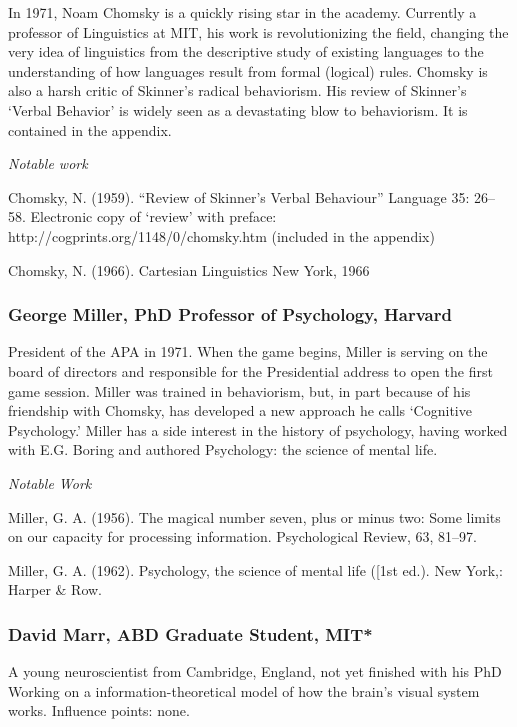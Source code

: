 \begin{refsection}
In 1971, Noam Chomsky is a quickly rising star in the academy. Currently a professor of Linguistics at MIT, his work is revolutionizing the field, changing the very idea of linguistics from the descriptive study of existing languages to the understanding of how languages result from formal (logical) rules. Chomsky is also a harsh critic of Skinner's radical behaviorism. His review of Skinner's `Verbal Behavior' is widely seen as a devastating blow to behaviorism. It is contained in the appendix.

\emph{Notable work}

Chomsky, N. (1959). ``Review of Skinner's Verbal Behaviour'' Language 35: 26--58. Electronic copy of `review' with preface: http:\slash \slash cogprints.org\slash 1148\slash 0\slash chomsky.htm (included in the appendix)

Chomsky, N. (1966). Cartesian Linguistics New York, 1966

\subsubsection{George Miller, PhD Professor of Psychology, Harvard}
\label{georgemillerphdprofessorofpsychologyharvard}

President of the APA in 1971. When the game begins, Miller is serving on the board of directors and responsible for the Presidential address to open the first game session. Miller was trained in behaviorism, but, in part because of his friendship with Chomsky, has developed a new approach he calls `Cognitive Psychology.' Miller has a side interest in the history of psychology, having worked with E.G. Boring and authored Psychology: the science of mental life.

\emph{Notable Work}

Miller, G. A. (1956). The magical number seven, plus or minus two: Some limits on our capacity for processing information. Psychological Review, 63, 81--97.

Miller, G. A. (1962). Psychology, the science of mental life ([1st ed.). New York,: Harper \& Row.

\subsubsection{David Marr, ABD Graduate Student, MIT*}
\label{davidmarrabdgraduatestudentmit}

A young neuroscientist from Cambridge, England, not yet finished with his PhD Working on a information-theoretical model of how the brain's visual system works.
Influence points: none.


\end{refsection}
